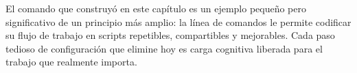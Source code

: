 El comando \texttt{\ProjectName{}} que construyó en este capítulo es un
ejemplo pequeño pero significativo de un principio más amplio: la línea
de comandos le permite codificar su flujo de trabajo en scripts
repetibles, compartibles y mejorables. Cada paso tedioso de configuración
que elimine hoy es carga cognitiva liberada para el trabajo que realmente
importa.


